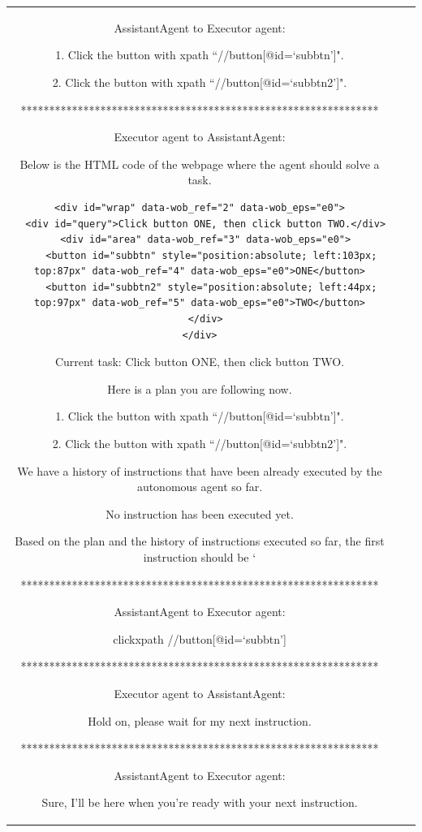 \begin{table}[h!]
\begin{tabular}{c|c|p{11cm}}
AssistantAgent to Executor agent:

1. Click the button with xpath ``//button[@id=`subbtn']".

2. Click the button with xpath ``//button[@id=`subbtn2']".

***************************************************************

Executor agent to AssistantAgent:

Below is the HTML code of the webpage where the agent should solve a task.

\begin{lstlisting}
<div id="wrap" data-wob_ref="2" data-wob_eps="e0">
  <div id="query">Click button ONE, then click button TWO.</div>
  <div id="area" data-wob_ref="3" data-wob_eps="e0">
    <button id="subbtn" style="position:absolute; left:103px; top:87px" data-wob_ref="4" data-wob_eps="e0">ONE</button>
    <button id="subbtn2" style="position:absolute; left:44px; top:97px" data-wob_ref="5" data-wob_eps="e0">TWO</button>
  </div>
</div>
\end{lstlisting}

Current task: Click button ONE, then click button TWO.


Here is a plan you are following now.

1. Click the button with xpath ``//button[@id=`subbtn']".

2. Click the button with xpath ``//button[@id=`subbtn2']".

We have a history of instructions that have been already executed by the autonomous agent so far.

No instruction has been executed yet.

Based on the plan and the history of instructions executed so far, the first instruction should be `

***************************************************************

AssistantAgent to Executor agent:

clickxpath //button[@id=`subbtn']

***************************************************************

Executor agent to AssistantAgent:

Hold on, please wait for my next instruction.

***************************************************************

AssistantAgent to Executor agent:

Sure, I'll be here when you're ready with your next instruction.



\end{tabular}
\end{table}
